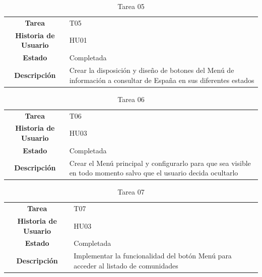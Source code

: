 \begin{table}[H]
	\begin{center}
		\begin{tabular}{| c | p{9cm} |}
			\hline
			
			\textbf{Tarea} & T05 \\
			\textbf{Historia de Usuario} & HU01 \\
			\textbf{Estado} & Completada \\
			\textbf{Descripción} & Crear la disposición y diseño de botones del Menú de información a consultar de España en sus diferentes estados \\ \hline
		\end{tabular}
		\caption{Tarea 05}
	\end{center}
\end{table}

\begin{table}[H]
	\begin{center}
		\begin{tabular}{| c | p{9cm} |}
			\hline
			
			\textbf{Tarea} & T06 \\
			\textbf{Historia de Usuario} & HU03 \\
			\textbf{Estado} & Completada \\
			\textbf{Descripción} & Crear el Menú principal y configurarlo para que sea visible en todo momento salvo que el usuario decida ocultarlo \\ \hline
		\end{tabular}
		\caption{Tarea 06}
	\end{center}
\end{table}

\begin{table}[H]
	\begin{center}
		\begin{tabular}{| c | p{9cm} |}
			\hline
			
			\textbf{Tarea} & T07 \\
			\textbf{Historia de Usuario} & HU03 \\
			\textbf{Estado} & Completada \\
			\textbf{Descripción} & Implementar la funcionalidad del botón Menú para acceder al listado de comunidades \\ \hline
		\end{tabular}
		\caption{Tarea 07}
	\end{center}
\end{table}

